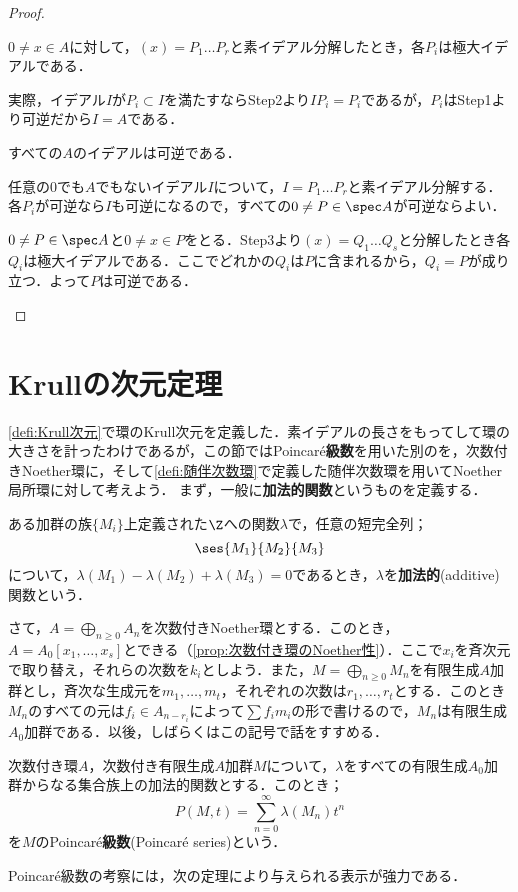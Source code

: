 \begin{proof}
\begin{step}
		\item $0\neq x\in A$に対して，$(x)=P_1\dots P_r$と素イデアル分解したとき，各$P_i$は極大イデアルである．
		
		実際，イデアル$I$が$P_i\subset I$を満たすならStep2より$IP_i=P_i$であるが，$P_i$はStep1より可逆だから$I=A$である．
		
		\item すべての$A$のイデアルは可逆である．
		
		任意の0でも$A$でもないイデアル$I$について，$I=P_1\dots P_r$と素イデアル分解する．各$P_i$が可逆なら$I$も可逆になるので，すべての$0\neq P\in\spec A$が可逆ならよい．
		
		$0\neq P\in\spec A$と$0\neq x\in P$をとる．Step3より$(x)=Q_1\dots Q_s$と分解したとき各$Q_i$は極大イデアルである．ここでどれかの$Q_i$は$P$に含まれるから，$Q_i=P$が成り立つ．よって$P$は可逆である．
	\end{step}
\end{proof}

\section{Krullの次元定理}
\ref{defi:Krull次元}で環のKrull次元を定義した．素イデアルの長さをもってして環の大きさを計ったわけであるが，この節ではPoincar\'e\textbf{級数}を用いた別のを，次数付きNoether環に，そして\ref{defi:随伴次数環}で定義した随伴次数環を用いてNoether局所環に対して考えよう．
まず，一般に\textbf{加法的関数}というものを定義する．
\begin{defi}[加法的関数]
	ある加群の族$\{M_i\}$上定義された$\Z$への関数$\lambda$で，任意の短完全列；
	\[\ses{M_1}{M_2}{M_3}\]
	について，$\lambda(M_1)-\lambda(M_2)+\lambda(M_3)=0$であるとき，$\lambda$を\textbf{加法的}(additive)関数という．
\end{defi}

さて，$A=\bigoplus_{n\geq0}A_n$を次数付きNoether環とする．このとき，$A=A_0[x_1,\dots,x_s]$とできる（\ref{prop:次数付き環のNoether性}）．ここで$x_i$を斉次元で取り替え，それらの次数を$k_i$としよう．また，$M=\bigoplus_{n\geq0}M_n$を有限生成$A$加群とし，斉次な生成元を$m_1,\dots,m_t$，それぞれの次数は$r_1,\dots,r_t$とする．このとき$M_n$のすべての元は$f_i\in A_{n-r_i}$によって$\sum f_im_i$の形で書けるので，$M_n$は有限生成$A_0$加群である．以後，しばらくはこの記号で話をすすめる．

\begin{defi}
	次数付き環$A$，次数付き有限生成$A$加群$M$について，$\lambda$をすべての有限生成$A_0$加群からなる集合族上の加法的関数とする．このとき；
	\[P(M,t)=\sum_{n=0}^\infty \lambda(M_n)t^n\]
	を$M$のPoincar\'e\textbf{級数}(Poincar\'e series)という．
\end{defi}
Poincar\'e級数の考察には，次の定理により与えられる表示が強力である．

